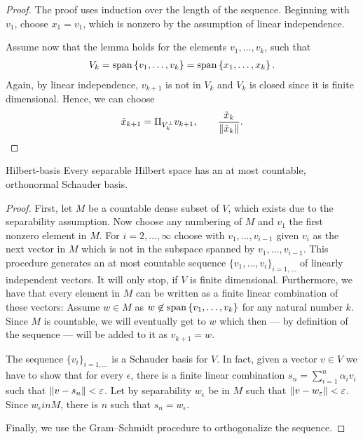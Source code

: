 \begin{proof}
  The proof uses induction over the length of the sequence.  Beginning
  with $v_1$, choose $x_1 = v_1$, which is nonzero by the assumption
  of linear independence.

  Assume now that the lemma holds for the elements $v_1,\dots,v_k$, such that
  \begin{gather*}
    V_k = \operatorname{span}\left\{v_1,\dots,v_k\right\} = \operatorname{span}\left\{x_1,\dots,x_k\right\}.
  \end{gather*}
  Again, by linear independence, $v_{k+1}$ is not in $V_k$ and $V_k$
  is closed since it is finite dimensional. Hence, we can choose
  \begin{gather*}
    \tilde x_{k+1} = \Pi_{V^\perp_k} v_{k+1},
    \qquad \frac{\tilde x_k}{\lVert\tilde x_k\rVert}.
  \end{gather*}
\end{proof}

  
\begin{Theorem}{Hilbert-basis}
  Every separable Hilbert space has an at most countable, orthonormal
  Schauder basis.
\end{Theorem}

\begin{proof}
  First, let $M$ be a countable dense subset
  of $V$, which exists due to the separability assumption. Now choose
  any numbering of $M$ and $v_1$ the first nonzero element in
  $M$. For $i=2,\dots,\infty$ choose with $v_1,\dots,v_{i-1}$ given
  $v_i$ as the next vector in $M$ which is not in the subspace spanned
  by $v_1,\dots,v_{i-1}$. This procedure generates an at most
  countable sequence $\{v_1, \dots, v_i\}_{i=1, \dots}$ of linearly
  independent vectors. It will only stop, if $V$ is finite dimensional.
  Furthermore, we have that every element in $M$ can be written as a finite
  linear combination of these vectors: Assume $w \in M$ as $w \not \in
  \operatorname{span}\left\{v_1,\dots,v_k\right\}$ for any natural number $k$. Since $M$ is countable,
  we will eventually get to $w$ which then --- by definition of the sequence
  --- will be added to it as $v_{k+1} = w$.
  
  The sequence $\{v_i\}_{i=1,\dots}$ is a Schauder basis for $V$. In fact, given a
  vector $v\in V$ we have to show that for every $\epsilon$, there is
  a finite linear combination $s_n = \sum_{i=1}^n \alpha_i v_i$ such
  that $\lVert v-s_n\rVert < \varepsilon$. Let by separability $w_\epsilon$ be in
  $M$ such that $\lVert v-w_\varepsilon\rVert < \varepsilon$. Since
  $w_\epsilon in M$, there is $n$ such that $s_n = w_\epsilon$.

  Finally, we use the Gram--Schmidt procedure to orthogonalize the
  sequence.
\end{proof}

